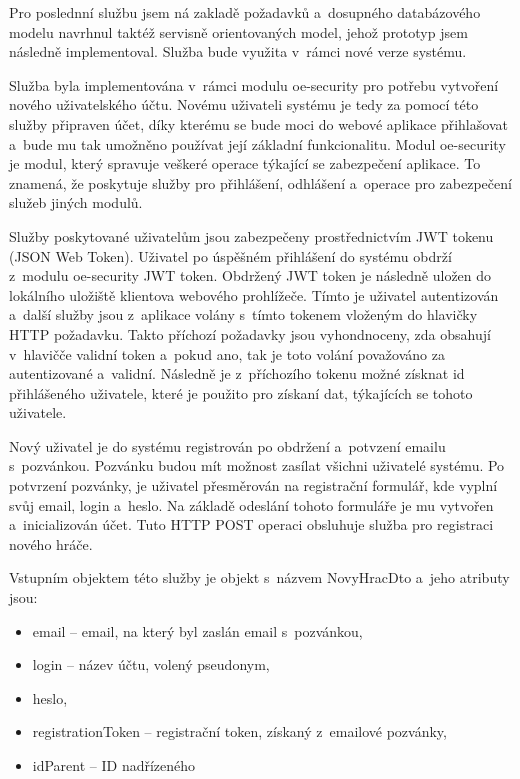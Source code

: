 \documentclass[12pt]{article}
\begin{document}
{Pro poslednní službu jsem ná zakladě požadavků a~dosupného databázového modelu navrhnul taktéž servisně orientovaných model,
jehož prototyp jsem následně implementoval. Služba bude využita v~rámci nové verze systému.

\clearpage


Služba byla implementována v~rámci modulu oe-security pro potřebu vytvoření nového uživatelského účtu.
Novému uživateli systému je tedy za pomocí této služby připraven účet,
díky kterému se bude moci do webové aplikace přihlašovat a~bude mu tak umožněno používat její základní funkcionalitu.
Modul oe-security je modul, který spravuje veškeré operace týkající se zabezpečení aplikace.
To znamená, že poskytuje služby pro přihlášení, odhlášení a~operace pro zabezpečení služeb jiných modulů.

Služby poskytované uživatelům jsou zabezpečeny prostřednictvím JWT tokenu (JSON Web Token).
Uživatel po úspěšném přihlášení do systému obdrží z~modulu oe-security JWT token.
Obdržený JWT token je následně uložen do lokálního uložiště klientova webového prohlížeče. 
Tímto je uživatel autentizován a~další služby jsou z~aplikace volány s~tímto tokenem vloženým do hlavičky HTTP požadavku. 
Takto příchozí požadavky jsou vyhondnoceny, zda obsahují v~hlavičče validní token a~pokud ano, 
tak je toto volání považováno za autentizované a~validní. Následně je z~příchozího tokenu možné získnat id přihlášeného uživatele,
které je použito pro získaní dat, týkajících se tohoto uživatele.

Nový uživatel je do systému registrován po obdržení a~potvzení emailu s~pozvánkou.
Pozvánku budou mít možnost zasílat všichni uživatelé systému.
Po potvrzení pozvánky, je uživatel přesměrován na registrační
formulář, kde vyplní svůj email, login a~heslo. 
Na základě odeslání tohoto formuláře je mu vytvořen a~inicializován účet. 
Tuto HTTP POST operaci obsluhuje služba pro registraci nového hráče.

Vstupním objektem této služby je objekt s~názvem NovyHracDto a~jeho atributy jsou:
\begin{itemize}
\item email -- email, na který byl zaslán email s~pozvánkou,
\item login -- název účtu, volený pseudonym,
\item heslo,
\item registrationToken -- registrační token, získaný z~emailové pozvánky,
\item idParent -- ID nadřízeného
\end{itemize}

}
\end{document}
